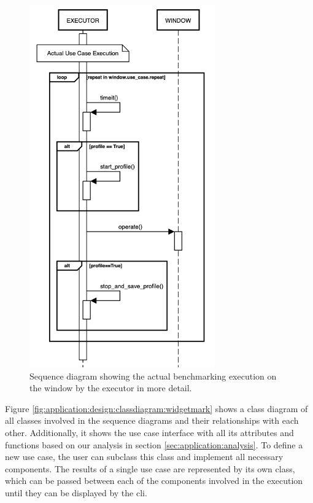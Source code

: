 \begin{figure}[h]
    \centering
    \includegraphics[width=8cm]{resources/img/sequence/executor}
    \caption{
        Sequence diagram showing the actual benchmarking execution on the window
        by the executor in more detail.
    }
    \label{fig:application:design:executor}
\end{figure}

Figure \ref{fig:application:design:classdiagram:widgetmark} shows a class
diagram of all classes involved in the sequence diagrams and their relationships
with each other. Additionally, it shows the use case interface with all its
attributes and functions based on our analysis in section
\ref{sec:application:analysis}. To define a new use case, the user can subclass
this class and implement all necessary components. The results of a single use
case are represented by its own class, which can be passed between each of the
components involved in the execution until they can be displayed by the \gls{cli}.

